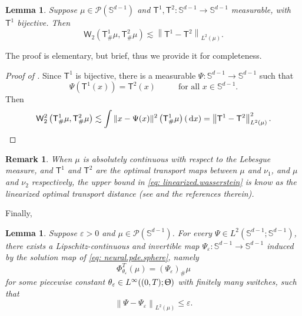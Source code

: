 \documentclass[a4paper,11pt]{article}
\theoremstyle{plain}
\newtheorem{lemma}[theorem]{Lemma}
\newtheorem{remark}[theorem]{Remark}
\newcommand{\diff}{\, \mathrm{d}}
\renewcommand{\S}{\mathbb{S}^{d-1}}
\renewcommand{\leq}{\leqslant}
\numberwithin{equation}{section}
\begin{document}
\begin{lemma}
\label{lem: monge}
Suppose $\mu\in \mathscr{P}(\S)$ and $\mathsf{T}^1,\mathsf{T}^2:\S\to\S$ measurable, with $\mathsf{T}^1$ bijective. Then
\begin{equation} \label{eq: linearized.wasserstein}
\mathsf{W}_2\left(\mathsf{T}^1_\#\mu,\mathsf{T}^2_\#\mu\right)\lesssim\left\|\mathsf{T}^1-\mathsf{T}^2\right\|_{L^2(\mu)}.
\end{equation}
\end{lemma}

The proof is elementary, but brief, thus we provide it for completeness.

\begin{proof}[Proof of ]
Since $\mathsf{T}^1$ is bijective, there is a measurable $\Psi:\S\to \S$ such that
\begin{equation*}
\Psi(\mathsf{T}^1(x))=\mathsf{T}^2(x) \hspace{1cm} \text{ for all } x\in\S. 
\end{equation*}
Then
\begin{equation*}
\mathsf{W}_2^2\left(\mathsf{T}^1_\#\mu,\mathsf{T}^2_\#\mu\right)\lesssim\int\|x-\Psi(x)\|^2\left(\mathsf{T}^1_\#\mu\right)(\diff x)=\left\|\mathsf{T}^1-\mathsf{T}^2\right\|_{L^2(\mu)}^2.\qedhere
\end{equation*}
\end{proof}

\begin{remark}
    When $\mu$ is absolutely continuous with respect to the Lebesgue measure, and
    $\mathsf{T}^1$ and $\mathsf{T}^2$ are the optimal transport maps between $\mu$ and $\nu_1$, and $\mu$ and $\nu_2$ respectively, the upper bound in \eqref{eq: linearized.wasserstein} is know as the \emph{linearized optimal transport distance} (see \cite{delalande2023quantitative, jiang2023algorithms} and the references therein).
\end{remark}

Finally,

\begin{lemma} \label{lem: univ.approx}
Suppose $\varepsilon>0$ and $\mu\in \mathscr{P}(\S)$. 
For every $\Psi\in L^2(\S;\S)$, there exists a Lipschitz-continuous and invertible map $\Psi_\varepsilon:\S\to\S$ induced by the solution map of \eqref{eq: neural.pde.sphere}, namely 
$$\Phi^T_{\theta_\varepsilon}(\mu)=(\Psi_\varepsilon)_\#\mu$$ for some piecewise constant $\theta_\varepsilon\in L^\infty((0,T);\Uptheta)$ with finitely many switches, such that
\begin{equation*}
\left\|\Psi-\Psi_\varepsilon\right\|_{L^2(\mu)}\leq\varepsilon.
\end{equation*}
\end{lemma}
\end{document}
